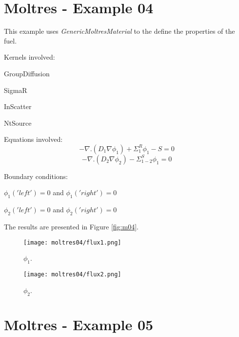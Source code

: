 \documentclass[11pt,letterpaper]{article}
\begin{document}
\newpage
\section{Moltres - Example 04}

This example uses \textit{GenericMoltresMaterial} to the define the properties of the fuel.

Kernels involved:
\begin{description}[font=$\bullet$\scshape\bfseries]
	\item[] GroupDiffusion
	\item[]	SigmaR
	\item[] InScatter
	\item[] NtSource
\end{description}

Equations involved:
\begin{equation}
-\nabla.(D_{1}\nabla\phi_{1})+\Sigma^{R}_{1}\phi_{1}-S=0
\end{equation}
\begin{equation}
-\nabla.(D_{2}\nabla\phi_{2})-\Sigma^{S}_{1-2}\phi_{1}=0
\end{equation}

Boundary conditions:
\begin{description}[]
	\item[] $\phi_{1}('left')=0$ and $\phi_{1}('right')=0$
	\item[] $\phi_{2}('left')=0$ and $\phi_{2}('right')=0$
\end{description}

The results are presented in Figure \ref{fig:m04}.
\begin{figure*}[!h]
	\centering
	\begin{subfigure}[t]{0.4\textwidth}
		\centering
		\texttt{[image: moltres04/flux1.png]} 
		\caption{$\phi_{1}$.}
		\label{fig:m04-flux1}
	\end{subfigure}
	\vspace{1cm}
	\begin{subfigure}[t]{0.4\textwidth}
		\centering
		\texttt{[image: moltres04/flux2.png]} 
		\caption{$\phi_{2}$.}
		\label{fig:m04-flux2}
	\end{subfigure}
	\hfill
	\caption{Flux.}
	\label{fig:m04}
\end{figure*}

\newpage
\section{Moltres - Example 05}
\end{document}

